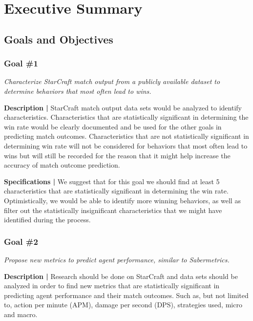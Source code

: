 \documentclass[a4paper,12pt]{report}
\begin{document}
\tableofcontents

\newpage

\setlength{\parskip}{\baselineskip}
\setlength{\parindent}{0in}

\chapter{Executive Summary}
\section{Goals and Objectives}
\subsection{Goal \#1}

\textit{Characterize StarCraft match output from a publicly available dataset to determine behaviors that most often lead to wins.}

\textbf{Description |} StarCraft match output data sets would be analyzed to identify characteristics. Characteristics that are statistically significant in determining the win rate would be clearly documented and be used for the other goals in predicting match outcomes. Characteristics that are not statistically significant in determining win rate will not be considered for behaviors that most often lead to wins but will still be recorded for the reason that it might help increase the accuracy of match outcome prediction.

\textbf{Specifications |} We suggest that for this goal we should find at least 5 characteristics that are statistically significant in determining the win rate. Optimistically, we would be able to identify more winning behaviors, as well as filter out the statistically insignificant characteristics that we might have identified during the process. 

\subsection{Goal \#2}

\textit{Propose new metrics to predict agent performance, similar to Sabermetrics.}

\textbf{Description |} Research should be done on StarCraft and data sets should be analyzed in order to find new metrics that are statistically significant in predicting agent performance and their match outcomes. Such as, but not limited to, action per minute (APM), damage per second (DPS), strategies used, micro and macro.
\end{document}
